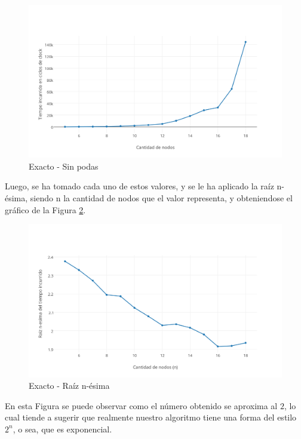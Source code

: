 \begin{figure}[htb]
	\begin{center}
    		\includegraphics[scale=0.6]{imagenes/exacto-aleatorio-sin.png}
	\end{center}
	\caption{Exacto - Sin podas}\label{fig:1A}
\end{figure}
\FloatBarrier

Luego, se ha tomado cada uno de estos valores, y se le ha aplicado la raíz n-ésima, siendo n la cantidad de nodos que el valor representa, y obteniendose el gráfico de la Figura \ref{fig:1B}.

\begin{figure}[htb]
	\begin{center}
    		\includegraphics[scale=0.6]{imagenes/exacto-aleatorio-sin-raiz.png}
	\end{center}
	\caption{Exacto - Raíz n-ésima}\label{fig:1B}
\end{figure}
\FloatBarrier

En esta Figura se puede observar como el número obtenido se aproxima al $2$, lo cual tiende a sugerir que realmente nuestro algoritmo tiene una forma del estilo $2^n$, o sea, que es exponencial.

